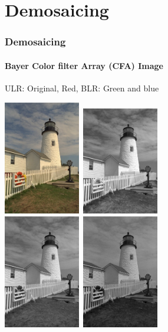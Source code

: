 \documentclass{beamer}
\begin{document}
\section{Demosaicing}
\begin{frame}
\frametitle{Demosaicing}
\framesubtitle{Bayer Color filter Array (CFA) Image}
\scriptsize{ULR: Original, Red, BLR: Green and blue}
\begin{center}
\includegraphics[width = 0.25\textwidth, height = 0.36\textheight]{images/L7_lighthouseOri.png}\
\includegraphics[width = 0.25\textwidth, height = 0.36\textheight]{images/L7_lighthouseRed.png}\\
\includegraphics[width = 0.25\textwidth, height = 0.36\textheight]{images/L7_lighthouseGreen.png}\
\includegraphics[width = 0.25\textwidth, height = 0.36\textheight]{images/L7_lighthouseBlue.png}
\end{center}
\end{frame}
\end{document}
